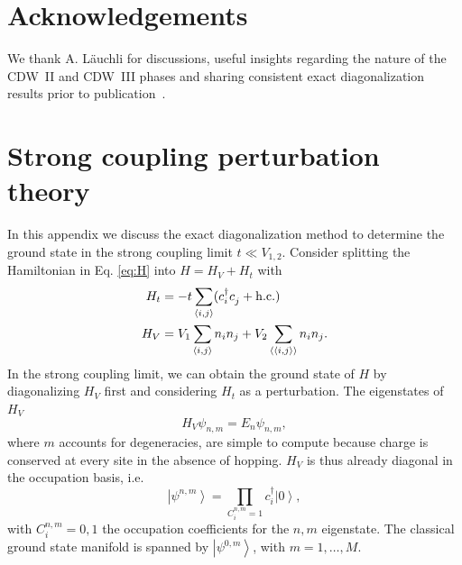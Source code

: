 \documentclass[aps,prx,10pt,twocolumn,floatfix,superscriptaddress,showpacs,numerical,footinbib]{revtex4-1}
\begin{document}
\section{Acknowledgements}

We thank A. L\"auchli for discussions, useful insights regarding the nature of the CDW~II and CDW~III phases
and sharing consistent exact diagonalization results prior to publication~\cite{CL15}.

\appendix

\section{\label{sec:appendix} Strong coupling perturbation theory}

In this appendix we discuss the exact diagonalization method to determine the ground state in the strong coupling limit $t \ll V_{1,2}$. 
%
Consider splitting the Hamiltonian in Eq. \eqref{eq:H} into $H =H_V + H_t$ with
\begin{align}
%
 H_t &=-t\sum_{\left\langle i,j\right\rangle}(c^{\dagger}_{i}c^{\vphantom{\dagger}}_{j}+ \mathrm{h.c.}) \\
H_V &= V_{1}\sum_{\left\langle i,j\right\rangle }n_{i}n_{j}+
%
V_{2}\sum_{\left\langle \left\langle i,j\right\rangle \right\rangle }n_{i}n_{j}. 
%
\label{eq:Hsplit}
\end{align}
%
In the strong coupling limit, we can obtain the ground state of $H$ by diagonalizing $H_V$ first and considering $H_t$ as a perturbation. 
%
The eigenstates of $H_V$
\begin{equation}
H_V \psi_{n,m} = E_n \psi_{n,m},
\end{equation}
where $m$ accounts for degeneracies, are simple to compute because charge is conserved at every site in the absence of hopping. 
%
$H_V$ is thus already diagonal in the occupation basis, i.e.
\begin{equation}
\left| \psi^{n,m}\right> = \prod_{C^{n,m}_i = 1} c^\dagger_i \left|0\right>,
\end{equation}
%
 with $C^{n,m}_i=0,1$ the occupation coefficients for the $n,m$ eigenstate. 
The classical ground state manifold is spanned by $\left|\psi^{0,m}\right>$, with $m=1,\dots,M$.   
\end{document}
